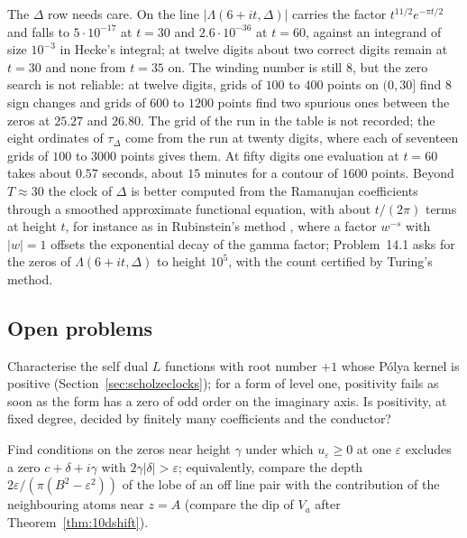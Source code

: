 The $\Delta$ row needs care. On the line $|\Lambda(6+it,\Delta)|$ carries the factor $t^{11/2}e^{-\pi t/2}$ and falls to $5\cdot10^{-17}$ at $t=30$ and $2.6\cdot10^{-36}$ at $t=60$, against an integrand of size $10^{-3}$ in Hecke's integral; at twelve digits about two correct digits remain at $t=30$ and none from $t=35$ on. The winding number is still $8$, but the zero search is not reliable: at twelve digits, grids of $100$ to $400$ points on $(0,30]$ find $8$ sign changes and grids of $600$ to $1200$ points find two spurious ones between the zeros at $25.27$ and $26.80$. The grid of the run in the table is not recorded; the eight ordinates of $\tau_\Delta$ come from the run at twenty digits, where each of seventeen grids of $100$ to $3000$ points gives them. At fifty digits one evaluation at $t=60$ takes about $0.57$ seconds, about $15$ minutes for a contour of $1600$ points. Beyond $T\approx30$ the clock of $\Delta$ is better computed from the Ramanujan coefficients through a smoothed approximate functional equation, with about $t/(2\pi)$ terms at height $t$, for instance as in Rubinstein's method \cite[Section~3.3]{rubinstein2005}, where a factor $w^{-s}$ with $|w|=1$ offsets the exponential decay of the gamma factor; Problem~14.1 asks for the zeros of $\Lambda(6+it,\Delta)$ to height $10^5$, with the count certified by Turing's method.

\subsection{Open problems}

\begin{problem}\label{op:scholzekernel}
Characterise the self dual $L$ functions with root number $+1$ whose P\'olya kernel is positive (Section~\ref{sec:scholzeclocks}); for a form of level one, positivity fails as soon as the form has a zero of odd order on the imaginary axis. Is positivity, at fixed degree, decided by finitely many coefficients and the conductor?
\end{problem}

\begin{problem}\label{op:scholzelobe}
Find conditions on the zeros near height $\gamma$ under which $u_\varepsilon\ge0$ at one $\varepsilon$ excludes a zero $c+\delta+i\gamma$ with $2\gamma|\delta|>\varepsilon$; equivalently, compare the depth $2\varepsilon/(\pi(B^2-\varepsilon^2))$ of the lobe of an off line pair with the contribution of the neighbouring atoms near $z=A$ (compare the dip of $V_a$ after Theorem~\ref{thm:10dshift}).
\end{problem}

